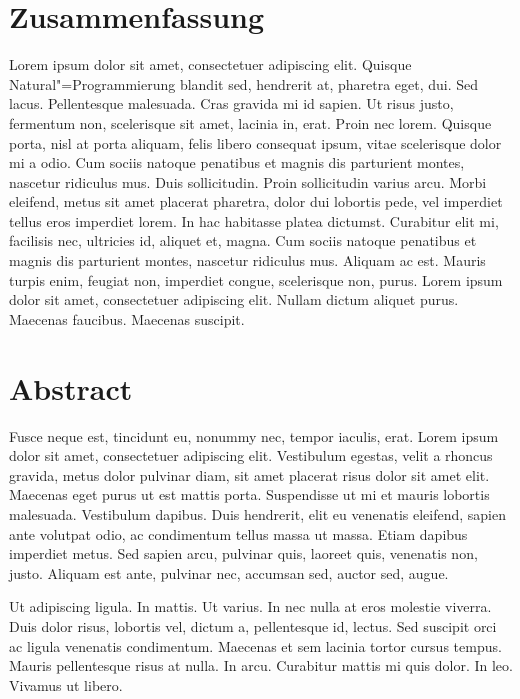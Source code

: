 \section*{Zusammenfassung}
\label{sec:Zusammenfassung}
Lorem ipsum dolor sit amet, consectetuer adipiscing elit. Quisque Natural"=Programmierung blandit sed, hendrerit at, pharetra eget, dui. Sed lacus. Pellentesque malesuada. Cras gravida mi id sapien. Ut risus justo, fermentum non, scelerisque sit amet, lacinia in, erat. Proin nec lorem. Quisque porta, nisl at porta aliquam, felis libero consequat ipsum, vitae scelerisque dolor mi a odio. Cum sociis natoque penatibus et magnis dis parturient montes, nascetur ridiculus mus. Duis sollicitudin. Proin sollicitudin varius arcu. Morbi eleifend, metus sit amet placerat pharetra, dolor dui lobortis pede, vel imperdiet tellus eros imperdiet lorem. In hac habitasse platea dictumst. Curabitur elit mi, facilisis nec, ultricies id, aliquet et, magna. Cum sociis natoque penatibus et magnis dis parturient montes, nascetur ridiculus mus. Aliquam ac est. Mauris turpis enim, feugiat non, imperdiet congue, scelerisque non, purus. Lorem ipsum dolor sit amet, consectetuer adipiscing elit. Nullam dictum aliquet purus. Maecenas faucibus. Maecenas suscipit.


\section*{Abstract}
\label{sec:Abstract}
Fusce neque est, tincidunt eu, nonummy nec, tempor iaculis, erat. Lorem ipsum dolor sit amet, consectetuer adipiscing elit. Vestibulum egestas, velit a rhoncus gravida, metus dolor pulvinar diam, sit amet placerat risus dolor sit amet elit. Maecenas eget purus ut est mattis porta. Suspendisse ut mi et mauris lobortis malesuada. Vestibulum dapibus. Duis hendrerit, elit eu venenatis eleifend, sapien ante volutpat odio, ac condimentum tellus massa ut massa. Etiam dapibus imperdiet metus. Sed sapien arcu, pulvinar quis, laoreet quis, venenatis non, justo. Aliquam est ante, pulvinar nec, accumsan sed, auctor sed, augue.

Ut adipiscing ligula. In mattis. Ut varius. In nec nulla at eros molestie viverra. Duis dolor risus, lobortis vel, dictum a, pellentesque id, lectus. Sed suscipit orci ac ligula venenatis condimentum. Maecenas et sem lacinia tortor cursus tempus. Mauris pellentesque risus at nulla. In arcu. Curabitur mattis mi quis dolor. In leo. Vivamus ut libero.

